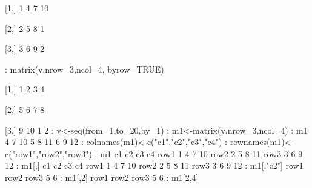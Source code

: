 \documentclass[a4paper,12pt]{article}
\begin{document}
{{     [1,]    1    4    7   10
\newline

     [2,]    2    5    8    1
\newline
    
     [3,]    3    6    9    2
\newline

: matrix(v,nrow=3,ncol=4, byrow=TRUE)
\newline
[,1] [,2] [,3] [,4]
\newline

[1,]    1    2    3    4
\newline

[2,]    5    6    7    8
\newline

[3,]    9   10    1    2
\newline
: v<-seq(from=1,to=20,by=1)
\newline
: m1<-matrix(v,nrow=3,ncol=4)
\newline
: m1
\newline
[,1] [,2] [,3] [,4]
    4    7   10
    5    8   11
    6    9   12
\newline
: colnames(m1)<-c("c1","c2","c3","c4")
\newline
: rownames(m1)<-c("row1","row2","row3")
\newline
: m1
\newline
c1 c2 c3 c4
\newline
row1  1  4  7 10
\newline
row2  2  5  8 11
\newline
row3  3  6  9 12
\newline
: m1[,]
\newline
c1 c2 c3 c4
\newline
row1  1  4  7 10
\newline
row2  2  5  8 11
\newline
row3  3  6  9 12
\newline
: m1[,"c2"]
\newline
row1 row2 row3 
    5    6 
\newline
: m1[,2]
\newline
row1 row2 row3 
    5    6 
\newline
: m1[2,4]
\newline
}}
\end{document}
